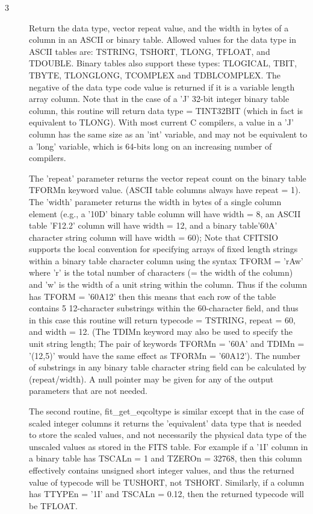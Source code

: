 \documentclass[11pt]{book}
\begin{document}
\begin{description}
\item[3 ] Return the data type, vector repeat value, and the width in bytes
    of a column in an ASCII or binary table.  Allowed values for the
    data type in ASCII tables are:  TSTRING, TSHORT, TLONG, TFLOAT, and
    TDOUBLE.  Binary tables also support these types: TLOGICAL, TBIT,
    TBYTE, TLONGLONG, TCOMPLEX and TDBLCOMPLEX.  The negative of the data type code
    value is returned if it is a variable length array column.  Note
    that in the case of a 'J' 32-bit integer binary table column, this
    routine will return data type = TINT32BIT (which in fact is
    equivalent to TLONG).  With most current C compilers, a value in a
    'J' column has the same size as an 'int' variable, and may not be
    equivalent to a 'long' variable, which is 64-bits long on an
    increasing number of compilers.

    The 'repeat' parameter returns the vector repeat count on the binary
    table TFORMn keyword value. (ASCII table columns always have repeat
    = 1).  The 'width' parameter returns the width in bytes of a single
    column element (e.g., a '10D' binary table column will have width =
    8, an ASCII table 'F12.2' column will have width = 12, and a binary
    table'60A' character string  column will have width = 60);  Note that
    CFITSIO supports the local convention for specifying arrays of
    fixed length strings within a binary table character column using
    the syntax TFORM = 'rAw' where 'r' is the total number of characters
    (= the width of the column) and 'w' is the width of a unit string
    within the column.  Thus if the column has TFORM = '60A12' then this
    means that each row of the table contains 5 12-character substrings
    within the 60-character field, and thus in this case this routine will
    return typecode = TSTRING, repeat = 60, and width = 12.  (The TDIMn
    keyword may also be used to specify the unit string length; The pair
    of keywords TFORMn = '60A' and TDIMn = '(12,5)'  would have the
    same effect as TFORMn = '60A12').  The number
    of substrings in any binary table character string field can be
    calculated by (repeat/width).  A null pointer may be given for any of
    the output parameters that are not needed.

   The second routine, fit\_get\_eqcoltype is similar except that in
   the case of scaled integer columns it returns the 'equivalent' data
   type that is needed to store the scaled values, and not necessarily
   the physical data type of the unscaled values as stored in the FITS
   table.  For example if a '1I' column in a binary table has TSCALn =
   1 and TZEROn = 32768, then this column effectively contains unsigned
   short integer values, and thus the returned value of typecode will
   be TUSHORT, not TSHORT.  Similarly, if a column has TTYPEn = '1I'
   and TSCALn = 0.12, then the returned typecode
  will be TFLOAT. \label{ffgtcl}
\end{description}
\end{document}
